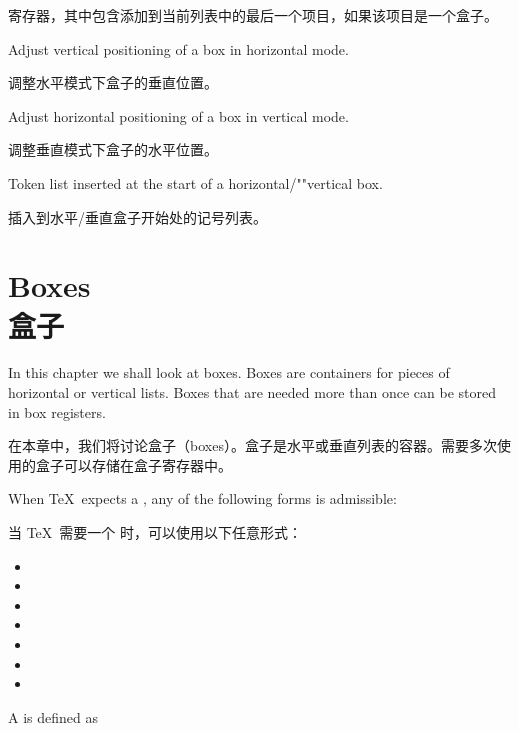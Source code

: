 \begin{inventory}
      寄存器，其中包含添加到当前列表中的最后一个项目，如果该项目是一个盒子。
\item [\cs{raise \cs{lower}}]
      Adjust vertical positioning of a box in horizontal mode. 

      调整水平模式下盒子的垂直位置。
\item [\cs{moveleft \cs{moveright}}]
      Adjust horizontal positioning of a box in vertical mode. 

      调整垂直模式下盒子的水平位置。
\item [\cs{everyhbox \cs{everyvbox}}]
\mdqon
      Token list inserted at the start of a horizontal/""vertical box.

      插入到水平/垂直盒子开始处的记号列表。
\mdqoff

\end{inventory}



\section{Boxes\\盒子}

In this chapter we shall look at boxes. Boxes are containers
for pieces of horizontal or vertical lists.
Boxes that are needed more than once can be stored in box registers.

在本章中，我们将讨论盒子（boxes）。盒子是水平或垂直列表的容器。需要多次使用的盒子可以存储在盒子寄存器中。


When \TeX\ expects a , any of the following forms
is admissible:

当 \TeX\ 需要一个  时，可以使用以下任意形式：

\begin{itemize}
\item {}\lb{}\rb
\item {}\lb{}\rb
\item {}\lb{}\rb
\item {}
\item {}
\item {}
\item {}
\end{itemize}
A  is defined as\label{box:spec}


